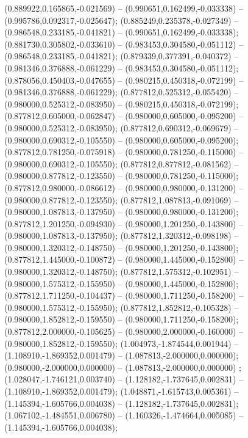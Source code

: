  (0.889922,0.165865,-0.021569) -- (0.990651,0.162499,-0.033338) -- (0.995786,0.092317,-0.025647);
 (0.885249,0.235378,-0.027349) -- (0.986548,0.233185,-0.041821) -- (0.990651,0.162499,-0.033338);
 (0.881730,0.305802,-0.033610) -- (0.983453,0.304580,-0.051112) -- (0.986548,0.233185,-0.041821);
 (0.879339,0.377391,-0.040372) -- (0.981346,0.376888,-0.061229) -- (0.983453,0.304580,-0.051112);
 (0.878056,0.450403,-0.047655) -- (0.980215,0.450318,-0.072199) -- (0.981346,0.376888,-0.061229);
 (0.877812,0.525312,-0.055420) -- (0.980000,0.525312,-0.083950) -- (0.980215,0.450318,-0.072199);
 (0.877812,0.605000,-0.062847) -- (0.980000,0.605000,-0.095200) -- (0.980000,0.525312,-0.083950);
 (0.877812,0.690312,-0.069679) -- (0.980000,0.690312,-0.105550) -- (0.980000,0.605000,-0.095200);
 (0.877812,0.781250,-0.075918) -- (0.980000,0.781250,-0.115000) -- (0.980000,0.690312,-0.105550);
 (0.877812,0.877812,-0.081562) -- (0.980000,0.877812,-0.123550) -- (0.980000,0.781250,-0.115000);
 (0.877812,0.980000,-0.086612) -- (0.980000,0.980000,-0.131200) -- (0.980000,0.877812,-0.123550);
 (0.877812,1.087813,-0.091069) -- (0.980000,1.087813,-0.137950) -- (0.980000,0.980000,-0.131200);
 (0.877812,1.201250,-0.094930) -- (0.980000,1.201250,-0.143800) -- (0.980000,1.087813,-0.137950);
 (0.877812,1.320312,-0.098198) -- (0.980000,1.320312,-0.148750) -- (0.980000,1.201250,-0.143800);
 (0.877812,1.445000,-0.100872) -- (0.980000,1.445000,-0.152800) -- (0.980000,1.320312,-0.148750);
 (0.877812,1.575312,-0.102951) -- (0.980000,1.575312,-0.155950) -- (0.980000,1.445000,-0.152800);
 (0.877812,1.711250,-0.104437) -- (0.980000,1.711250,-0.158200) -- (0.980000,1.575312,-0.155950);
 (0.877812,1.852812,-0.105328) -- (0.980000,1.852812,-0.159550) -- (0.980000,1.711250,-0.158200);
 (0.877812,2.000000,-0.105625) -- (0.980000,2.000000,-0.160000) -- (0.980000,1.852812,-0.159550);
 (1.004973,-1.874544,0.001944) -- (1.108910,-1.869352,0.001479) -- (1.087813,-2.000000,0.000000);
 (0.980000,-2.000000,0.000000) -- (1.087813,-2.000000,0.000000) ;
 (1.028047,-1.746121,0.003740) -- (1.128182,-1.737645,0.002831) -- (1.108910,-1.869352,0.001479);
 (1.048871,-1.615743,0.005361) -- (1.145394,-1.605766,0.004038) -- (1.128182,-1.737645,0.002831);
 (1.067102,-1.484551,0.006780) -- (1.160326,-1.474664,0.005085) -- (1.145394,-1.605766,0.004038);
